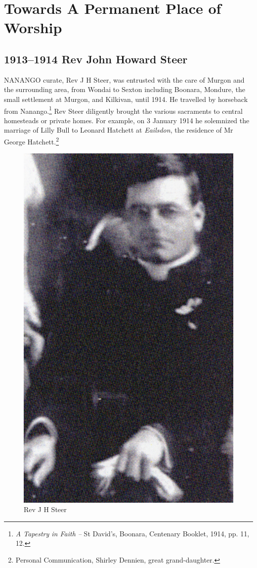 \balance


\printendnotes[custom]
\setcounter{endnote}{0}
\chapter{Towards A Permanent Place of Worship}
\nobalance


\section{1913--1914 Rev John Howard Steer}



\lettrine[lines=3]{N}{ANANGO}
 curate, Rev J H Steer, was entrusted with the care of Murgon and the surrounding area, from Wondai to Sexton including Boonara, Mondure, the small settlement at Murgon, and Kilkivan, until 1914. He travelled by horseback from Nanango.\footnote{\emph{A Tapestry in Faith --} St David's, Boonara, Centenary Booklet, 1914, pp. 11, 12.} Rev Steer diligently brought the various sacraments to central homesteads or private homes. For example, on 3 January 1914 he solemnized the marriage of Lilly Bull to Leonard Hatchett at \emph{Eailsdon}, the residence of Mr George Hatchett.\footnote{Personal Communication, Shirley Dennien, great grand-daughter.}







\begin{figure}
\begin{center}
\includegraphics[width=.6\linewidth,center]{../images/JHSteer.jpg}
\caption{Rev J H Steer}
\end{center}
\end{figure}




